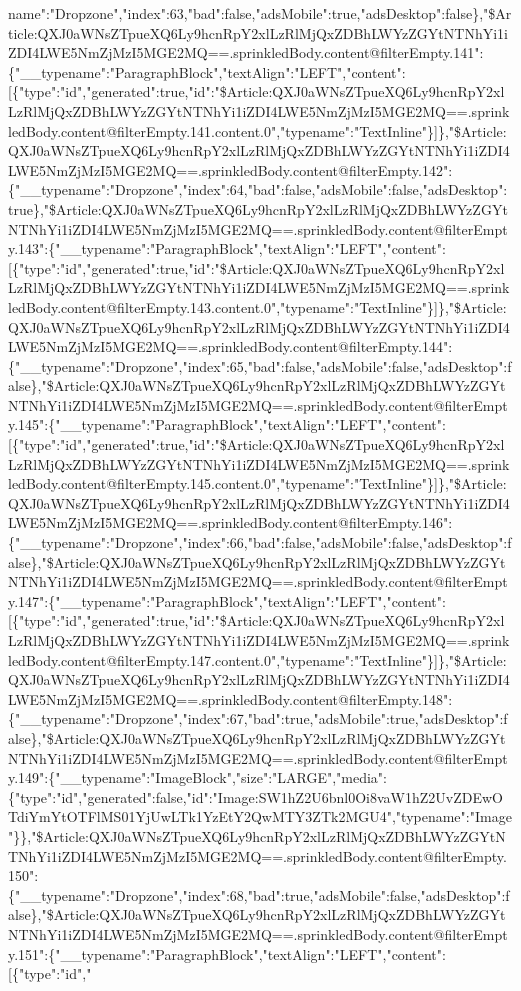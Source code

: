 name":"Dropzone","index":63,"bad":false,"adsMobile":true,"adsDesktop":false\},"\$Article:QXJ0aWNsZTpueXQ6Ly9hcnRpY2xlLzRlMjQxZDBhLWYzZGYtNTNhYi1iZDI4LWE5NmZjMzI5MGE2MQ==.sprinkledBody.content@filterEmpty.141":\{"\_\_typename":"ParagraphBlock","textAlign":"LEFT","content":{[}\{"type":"id","generated":true,"id":"\$Article:QXJ0aWNsZTpueXQ6Ly9hcnRpY2xlLzRlMjQxZDBhLWYzZGYtNTNhYi1iZDI4LWE5NmZjMzI5MGE2MQ==.sprinkledBody.content@filterEmpty.141.content.0","typename":"TextInline"\}{]}\},"\$Article:QXJ0aWNsZTpueXQ6Ly9hcnRpY2xlLzRlMjQxZDBhLWYzZGYtNTNhYi1iZDI4LWE5NmZjMzI5MGE2MQ==.sprinkledBody.content@filterEmpty.142":\{"\_\_typename":"Dropzone","index":64,"bad":false,"adsMobile":false,"adsDesktop":true\},"\$Article:QXJ0aWNsZTpueXQ6Ly9hcnRpY2xlLzRlMjQxZDBhLWYzZGYtNTNhYi1iZDI4LWE5NmZjMzI5MGE2MQ==.sprinkledBody.content@filterEmpty.143":\{"\_\_typename":"ParagraphBlock","textAlign":"LEFT","content":{[}\{"type":"id","generated":true,"id":"\$Article:QXJ0aWNsZTpueXQ6Ly9hcnRpY2xlLzRlMjQxZDBhLWYzZGYtNTNhYi1iZDI4LWE5NmZjMzI5MGE2MQ==.sprinkledBody.content@filterEmpty.143.content.0","typename":"TextInline"\}{]}\},"\$Article:QXJ0aWNsZTpueXQ6Ly9hcnRpY2xlLzRlMjQxZDBhLWYzZGYtNTNhYi1iZDI4LWE5NmZjMzI5MGE2MQ==.sprinkledBody.content@filterEmpty.144":\{"\_\_typename":"Dropzone","index":65,"bad":false,"adsMobile":false,"adsDesktop":false\},"\$Article:QXJ0aWNsZTpueXQ6Ly9hcnRpY2xlLzRlMjQxZDBhLWYzZGYtNTNhYi1iZDI4LWE5NmZjMzI5MGE2MQ==.sprinkledBody.content@filterEmpty.145":\{"\_\_typename":"ParagraphBlock","textAlign":"LEFT","content":{[}\{"type":"id","generated":true,"id":"\$Article:QXJ0aWNsZTpueXQ6Ly9hcnRpY2xlLzRlMjQxZDBhLWYzZGYtNTNhYi1iZDI4LWE5NmZjMzI5MGE2MQ==.sprinkledBody.content@filterEmpty.145.content.0","typename":"TextInline"\}{]}\},"\$Article:QXJ0aWNsZTpueXQ6Ly9hcnRpY2xlLzRlMjQxZDBhLWYzZGYtNTNhYi1iZDI4LWE5NmZjMzI5MGE2MQ==.sprinkledBody.content@filterEmpty.146":\{"\_\_typename":"Dropzone","index":66,"bad":false,"adsMobile":false,"adsDesktop":false\},"\$Article:QXJ0aWNsZTpueXQ6Ly9hcnRpY2xlLzRlMjQxZDBhLWYzZGYtNTNhYi1iZDI4LWE5NmZjMzI5MGE2MQ==.sprinkledBody.content@filterEmpty.147":\{"\_\_typename":"ParagraphBlock","textAlign":"LEFT","content":{[}\{"type":"id","generated":true,"id":"\$Article:QXJ0aWNsZTpueXQ6Ly9hcnRpY2xlLzRlMjQxZDBhLWYzZGYtNTNhYi1iZDI4LWE5NmZjMzI5MGE2MQ==.sprinkledBody.content@filterEmpty.147.content.0","typename":"TextInline"\}{]}\},"\$Article:QXJ0aWNsZTpueXQ6Ly9hcnRpY2xlLzRlMjQxZDBhLWYzZGYtNTNhYi1iZDI4LWE5NmZjMzI5MGE2MQ==.sprinkledBody.content@filterEmpty.148":\{"\_\_typename":"Dropzone","index":67,"bad":true,"adsMobile":true,"adsDesktop":false\},"\$Article:QXJ0aWNsZTpueXQ6Ly9hcnRpY2xlLzRlMjQxZDBhLWYzZGYtNTNhYi1iZDI4LWE5NmZjMzI5MGE2MQ==.sprinkledBody.content@filterEmpty.149":\{"\_\_typename":"ImageBlock","size":"LARGE","media":\{"type":"id","generated":false,"id":"Image:SW1hZ2U6bnl0Oi8vaW1hZ2UvZDEwOTdiYmYtOTFlMS01YjUwLTk1YzEtY2QwMTY3ZTk2MGU4","typename":"Image"\}\},"\$Article:QXJ0aWNsZTpueXQ6Ly9hcnRpY2xlLzRlMjQxZDBhLWYzZGYtNTNhYi1iZDI4LWE5NmZjMzI5MGE2MQ==.sprinkledBody.content@filterEmpty.150":\{"\_\_typename":"Dropzone","index":68,"bad":true,"adsMobile":false,"adsDesktop":false\},"\$Article:QXJ0aWNsZTpueXQ6Ly9hcnRpY2xlLzRlMjQxZDBhLWYzZGYtNTNhYi1iZDI4LWE5NmZjMzI5MGE2MQ==.sprinkledBody.content@filterEmpty.151":\{"\_\_typename":"ParagraphBlock","textAlign":"LEFT","content":{[}\{"type":"id","